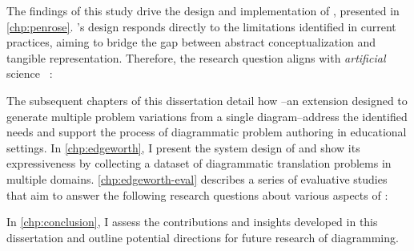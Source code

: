 \label{rq:diagrammer}


The findings of this study drive the design and implementation of \Penrose, presented in \cref{chp:penrose}. \Penrose's design responds directly to the limitations identified in current practices, aiming to bridge the gap between abstract conceptualization and tangible representation. Therefore, the research question aligns with \textit{artificial} science ~\cite{simon_sciences_1969}:

\label{rq:expressiveness}

The subsequent chapters of this dissertation detail how \Edgeworth--an extension designed to generate multiple problem variations from a single diagram--address the identified needs and support the process of diagrammatic problem authoring in educational settings. In \cref{chp:edgeworth}, I present the system design of \Edgeworth and show its expressiveness by collecting a dataset of diagrammatic translation problems in multiple domains. \cref{chp:edgeworth-eval} describes a series of evaluative studies that aim to answer the following research questions about various aspects of \Edgeworth:


In \cref{chp:conclusion}, I assess the contributions and insights developed in this dissertation and outline potential directions for future research of diagramming.


